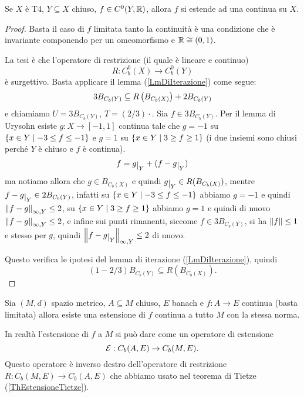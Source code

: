 \begin{theorem}\label{ThEstensioneTietze}
Se $X$ \`e T4, $Y\subseteq X$ chiuso, $f\in C^0(Y,\mathbb{R})$, allora $f$ si estende ad una continua su $X$.
\end{theorem}
\begin{proof}
Basta il caso di $f$ limitata tanto la continuit\`a \`e una condizione che \`e invariante componendo per un omeomorfismo e $\mathbb{R}\cong (0,1)$.

La tesi \`e che l'operatore di restrizione (il quale \`e lineare e continuo)
\[R:C_b^0(X)\to C_b^0(Y)\]
\`e surgettivo. Basta applicare il lemma (\ref{LmDiIterazione}) come segue:
\[3B_{C_b(Y)}\subseteq R\left({B_{C_b(X)}}\right)+2B_{C_b(Y)}\]
e chiamiamo $U=3B_{C_b(Y)}$, $T=(2/3)\cdot$. Sia $f\in 3B_{C_b(Y)}$. Per il lemma di Urysohn esiste $g:X\to[-1,1]$ continua tale che $g=-1$ su $\left\{{x\in Y\mid -3\leq f\leq -1}\right\}$ e $g=1$ su $\left\{{x\in Y\mid 3\geq f\geq 1}\right\}$ (i due insiemi sono chiusi perch\'e $Y$ \`e chiuso e $f$ \`e continua).
\[f=g\res Y+(f-g\res Y)\]
ma notiamo allora che $g\in B_{C_b(X)}$ e quindi $g\res Y\in R(B_{C_b(X)})$, mentre $f-g\res Y\in 2B_{C_b(Y)}$, infatti su $\left\{{x\in Y\mid -3\leq f\leq -1}\right\}$ abbiamo $g=-1$ e quindi $\left\Vert{f-g}\right\Vert_{\infty,Y}\leq 2$, su $\left\{{x\in Y\mid 3\geq f\geq 1}\right\}$ abbiamo $g=1$ e quindi di nuovo $\left\Vert{f-g}\right\Vert_{\infty,Y}\leq 2$, e infine sui punti rimanenti, siccome $f\in 3B_{C_b(Y)}$, si ha $\left\Vert{f}\right\Vert\leq 1$ e stesso per $g$, quindi $\norm{f-g\res Y}_{\infty,Y}\leq 2$ di nuovo.

Questo verifica le ipotesi del lemma di iterazione (\ref{LmDiIterazione}), quindi 
\[(1-2/3)B_{C_b(Y)}\subseteq R(B_{C_b(X)}).\]
\end{proof}

\begin{theorem}[Dugundji]\label{ThEstensioneDugundji}
Sia $(M,d)$ spazio metrico, $A\subseteq M$ chiuso, $E$ banach e $f:A\to E$ continua (basta limitata) allora esiste una estensione di $f$ continua a tutto $M$ con la stessa norma.
\end{theorem}

\begin{remark}
In realt\`a l'estensione di $f$ a $M$ si pu\`o dare come un operatore di estensione
\[\mathcal{E}:C_b(A,E)\to C_b(M,E).\]
Questo operatore \`e inverso destro dell'operatore di restrizione $R:C_b(M,E)\to C_b(A,E)$ che abbiamo usato nel teorema di Tietze (\ref{ThEstensioneTietze}).
\end{remark}


